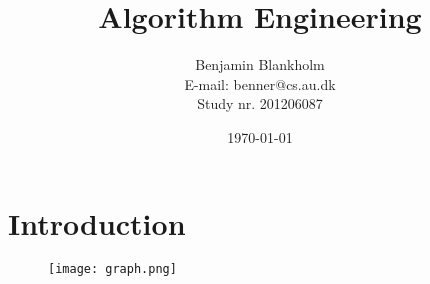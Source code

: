 \documentclass{article}
\title{Algorithm Engineering}
\author{Benjamin Blankholm \\
		E-mail: benner@cs.au.dk \\
		Study nr. 201206087}
\date{\today}
\begin{document}
\maketitle

\section{Introduction}

\begin{figure}[hbt]
  \texttt{[image: graph.png]}
  \caption{}
\end{figure}
\end{document}
